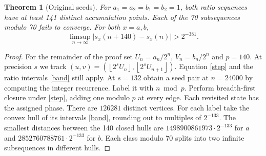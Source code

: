 \documentclass[11pt,letterpaper]{article}
\newtheorem{theorem}{Theorem}
\newcommand{\fl}[1]{\left\lfloor#1\right\rfloor}
\begin{document}
\newpage
\begin{theorem}[Original seeds]
For $a_1=a_2=b_1=b_2=1$, both ratio sequences have at least 141 distinct accumulation points. Each of the 70 subsequences modulo 70 fails to converge. For both $x=a,b$,
\[
 \limsup_{n\to\infty}|s_x(n+140)-s_x(n)|>2^{-381}.
\]
\end{theorem}
\begin{proof}
For the remainder of the proof set $U_n=a_n/2^n$, $V_n=b_n/2^n$ and $p=140$. At precision $s$ we track $(u,v)=(\fl{2^s U_n},\fl{2^s U_{n+1}})$. Equation \eqref{step} and the ratio intervals \eqref{band} still apply. At $s=132$ obtain a seed pair at $n=24000$ by computing the integer recurrence. Label it with $n\bmod p$. Perform breadth-first closure under \eqref{step}, adding one modulo $p$ at every edge. Each revisited state has the assigned phase. There are $126281$ distinct vertices. For each label take the convex hull of its intervals \eqref{band}, rounding out to multiples of $2^{-133}$. The smallest distances between the 140 closed hulls are $1498900861973\cdot2^{-133}$ for $a$ and $2852760788761\cdot2^{-133}$ for $b$. Each class modulo 70 splits into two infinite subsequences in different hulls.


\end{proof}
\end{document}
